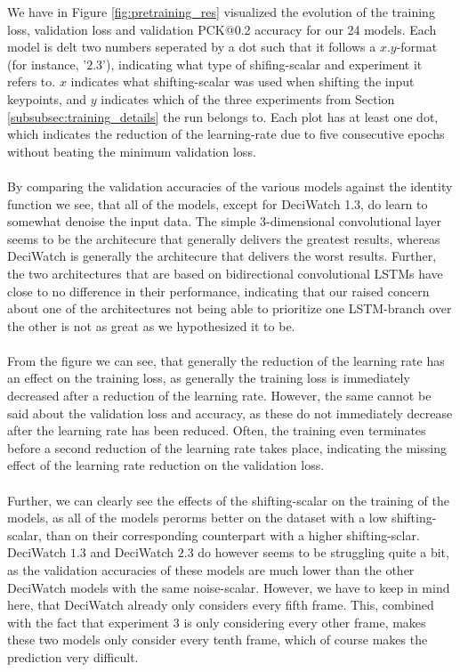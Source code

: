 \documentclass[./main.tex]{subfiles}
\begin{document}
We have in Figure \ref{fig:pretraining_res} visualized the evolution of the training loss, validation loss and validation PCK@0.2 accuracy for our 24 models. Each model is delt two numbers seperated by a dot such that it follows a $x.y$-format (for instance, '$2.3$'), indicating what type of shifing-scalar and experiment it refers to. $x$ indicates what shifting-scalar was used when shifting the input keypoints, and $y$ indicates which of the three experiments from Section \ref{subsubsec:training_details} the run belongs to. Each plot has at least one dot, which indicates the reduction of the learning-rate due to five consecutive epochs without beating the minimum validation loss.
\\
\\
By comparing the validation accuracies of the various models against the identity function we see, that all of the models, except for DeciWatch 1.3, do learn to somewhat denoise the input data. The simple 3-dimensional convolutional layer seems to be the architecure that generally delivers the greatest results, whereas DeciWatch is generally the architecure that delivers the worst results. Further, the two architectures that are based on bidirectional convolutional LSTMs have close to no difference in their performance, indicating that our raised concern about one of the architectures not being able to prioritize one LSTM-branch over the other is not as great as we hypothesized it to be.
\\
\\
From the figure we can see, that generally the reduction of the learning rate has an effect on the training loss, as generally the training loss is immediately decreased after a reduction of the learning rate. However, the same cannot be said about the validation loss and accuracy, as these do not immediately decrease after the learning rate has been reduced. Often, the training even terminates before a second reduction of the learning rate takes place, indicating the missing effect of the learning rate reduction on the validation loss.
\\
\\
Further, we can clearly see the effects of the shifting-scalar on the training of the models, as all of the models perorms better on the dataset with a low shifting-scalar, than on their corresponding counterpart with a higher shifting-sclar. DeciWatch $1.3$ and DeciWatch $2.3$ do however seems to be struggling quite a bit, as the validation accuracies of these models are much lower than the other DeciWatch models with the same noise-scalar. However, we have to keep in mind here, that DeciWatch already only considers every fifth frame. This, combined with the fact that experiment $3$ is only considering every other frame, makes these two models only consider every tenth frame, which of course makes the prediction very difficult.
\end{document}
